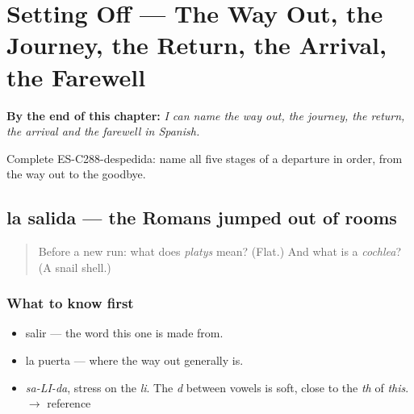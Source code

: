 
\chapter{Setting Off --- The Way Out, the Journey, the Return, the Arrival, the Farewell}
\label{ch:la-partida}

\begin{chapteropening}
\textbf{By the end of this chapter:} \emph{I can name the way out, the journey, the return, the arrival and the farewell in Spanish.}

Complete ES-C288-despedida: name all five stages of a departure in order, from the way out to the goodbye.
\end{chapteropening}

\section[la salida]{la salida — the Romans jumped out of rooms}

\label{lesson:ES-C288-salida}



\begin{quote}
Before a new run: what does \emph{platys} mean? (Flat.) And what is a \emph{cochlea}? (A snail shell.)
\end{quote}

\subsection*{What to know first}
\begin{itemize}
\raggedright
  \item salir — the word this one is made from.
  \item la puerta — where the way out generally is.
\end{itemize}

\begin{sounds}
\begin{itemize}
\raggedright
  \item \emph{sa-LI-da}, stress on the \emph{li}. The \emph{d} between vowels is soft, close to the \emph{th} of \emph{this}. $\to$ reference
\end{itemize}
\end{sounds}

